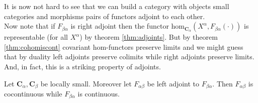 It is now not hard to see that we can build a category with objects small categories and morphisms pairs of functors adjoint to each other.
\\
Now note that if $F_{\beta\alpha}$ is right adjoint then the functor $\mathrm{hom}_{\mathbf{C}_{\alpha}}(X^{\alpha},F_{\beta\alpha}(\cdot))$ is representable (for all $X^{\alpha}$) by theorem \ref{thm:adjoints}. But by theorem \ref{thm:cohomiscont} covariant hom-functors preserve limits and we might guess that by duality left adjoints preserve colimits while right adjoints preserve limits. And, in fact, this is a striking property of adjoints.
\\
\begin{thm}
\label{thm:adjointlimit}
Let $\mathbf{C}_{\alpha},\mathbf{C}_{\beta}$ be locally small. Moreover let $F_{\alpha\beta}$ be left adjoint to $F_{\beta\alpha}$. Then $F_{\alpha\beta}$ is cocontinuous while $F_{\beta\alpha}$ is continuous.
\end{thm}
